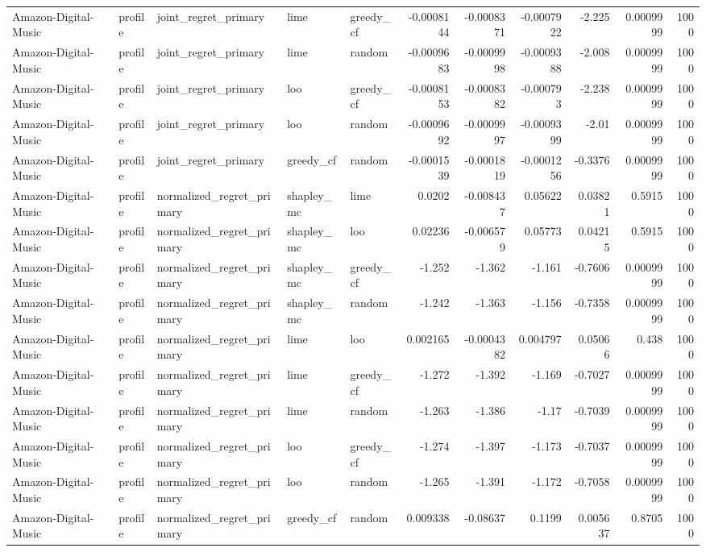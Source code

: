 \begin{table}[t]
\begin{tabular}{lllllrrrrrr}
Amazon-Digital-Music & profile & joint\_regret\_primary & lime & greedy\_cf & -0.0008144 & -0.0008371 & -0.0007922 & -2.225 & 0.0009999 & 1000 \\
Amazon-Digital-Music & profile & joint\_regret\_primary & lime & random & -0.0009683 & -0.0009998 & -0.0009388 & -2.008 & 0.0009999 & 1000 \\
Amazon-Digital-Music & profile & joint\_regret\_primary & loo & greedy\_cf & -0.0008153 & -0.0008382 & -0.000793 & -2.238 & 0.0009999 & 1000 \\
Amazon-Digital-Music & profile & joint\_regret\_primary & loo & random & -0.0009692 & -0.0009997 & -0.0009399 & -2.01 & 0.0009999 & 1000 \\
Amazon-Digital-Music & profile & joint\_regret\_primary & greedy\_cf & random & -0.0001539 & -0.0001819 & -0.0001256 & -0.3376 & 0.0009999 & 1000 \\
Amazon-Digital-Music & profile & normalized\_regret\_primary & shapley\_mc & lime & 0.0202 & -0.008437 & 0.05622 & 0.03821 & 0.5915 & 1000 \\
Amazon-Digital-Music & profile & normalized\_regret\_primary & shapley\_mc & loo & 0.02236 & -0.006579 & 0.05773 & 0.04215 & 0.5915 & 1000 \\
Amazon-Digital-Music & profile & normalized\_regret\_primary & shapley\_mc & greedy\_cf & -1.252 & -1.362 & -1.161 & -0.7606 & 0.0009999 & 1000 \\
Amazon-Digital-Music & profile & normalized\_regret\_primary & shapley\_mc & random & -1.242 & -1.363 & -1.156 & -0.7358 & 0.0009999 & 1000 \\
Amazon-Digital-Music & profile & normalized\_regret\_primary & lime & loo & 0.002165 & -0.0004382 & 0.004797 & 0.05066 & 0.438 & 1000 \\
Amazon-Digital-Music & profile & normalized\_regret\_primary & lime & greedy\_cf & -1.272 & -1.392 & -1.169 & -0.7027 & 0.0009999 & 1000 \\
Amazon-Digital-Music & profile & normalized\_regret\_primary & lime & random & -1.263 & -1.386 & -1.17 & -0.7039 & 0.0009999 & 1000 \\
Amazon-Digital-Music & profile & normalized\_regret\_primary & loo & greedy\_cf & -1.274 & -1.397 & -1.173 & -0.7037 & 0.0009999 & 1000 \\
Amazon-Digital-Music & profile & normalized\_regret\_primary & loo & random & -1.265 & -1.391 & -1.172 & -0.7058 & 0.0009999 & 1000 \\
Amazon-Digital-Music & profile & normalized\_regret\_primary & greedy\_cf & random & 0.009338 & -0.08637 & 0.1199 & 0.005637 & 0.8705 & 1000 \\

\end{tabular}
\end{table}

